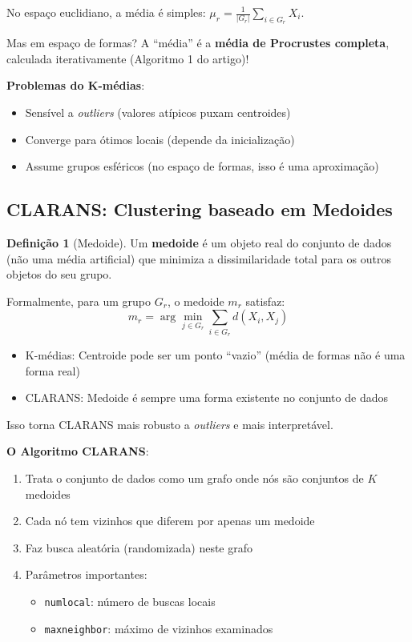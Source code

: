 \documentclass[12pt,a4paper]{article}
\theoremstyle{definition}
\newtheorem{definicao}{Definição}[section]
\begin{document}
\begin{tcolorbox}[caixaimportante={Adaptação para Formas}]
No espaço euclidiano, a média é simples: $\mu_r = \frac{1}{|G_r|}\sum_{i \in G_r} X_i$. 

Mas em espaço de formas? A ``média'' é a \textbf{média de Procrustes completa}, calculada iterativamente (Algoritmo 1 do artigo)!
\end{tcolorbox}

\textbf{Problemas do K-médias}:
\begin{itemize}
    \item Sensível a \textit{outliers} (valores atípicos puxam centroides)
    \item Converge para ótimos locais (depende da inicialização)
    \item Assume grupos esféricos (no espaço de formas, isso é uma aproximação)
\end{itemize}

\subsection{CLARANS: Clustering baseado em Medoides}

\begin{definicao}[Medoide]
Um \textbf{medoide} é um objeto real do conjunto de dados (não uma média artificial) que minimiza a dissimilaridade total para os outros objetos do seu grupo.

Formalmente, para um grupo $G_r$, o medoide $m_r$ satisfaz:
\begin{equation}
m_r = \arg\min_{j \in G_r} \sum_{i \in G_r} d(X_i, X_j)
\end{equation}
\end{definicao}

\begin{tcolorbox}[caixaconceito={K-médias vs.
CLARANS}]
\begin{itemize}
    \item K-médias: Centroide pode ser um ponto ``vazio'' (média de formas não é uma forma real)
    \item CLARANS: Medoide é sempre uma forma existente no conjunto de dados
\end{itemize}
Isso torna CLARANS mais robusto a \textit{outliers} e mais interpretável.
\end{tcolorbox}

\textbf{O Algoritmo CLARANS}:
\begin{enumerate}
    \item Trata o conjunto de dados como um grafo onde nós são conjuntos de $K$ medoides
    \item Cada nó tem vizinhos que diferem por apenas um medoide
    \item Faz busca aleatória (randomizada) neste grafo
    \item Parâmetros importantes:
    \begin{itemize}
        \item \texttt{numlocal}: número de buscas locais
        \item \texttt{maxneighbor}: máximo de vizinhos examinados
    \end{itemize}
\end{enumerate}
\end{document}
